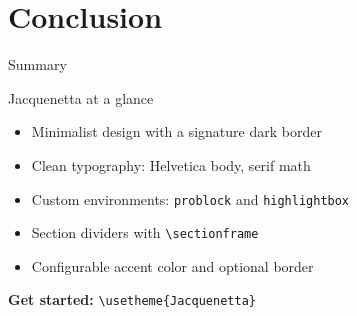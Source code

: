 \documentclass[aspectratio=169]{beamer}
\begin{document}
\section{Conclusion}


\begin{frame}{Summary}
    \begin{problock}{Jacquenetta at a glance}
        \begin{itemize}
            \item Minimalist design with a signature dark border
            \item Clean typography: Helvetica body, serif math
            \item Custom environments: \texttt{problock} and
                  \texttt{highlightbox}
            \item Section dividers with \texttt{\textbackslash sectionframe}
            \item Configurable accent color and optional border
        \end{itemize}
    \end{problock}

    \vspace{0.3cm}
    \begin{highlightbox}
        \centering
        \textbf{Get started:}\quad
        \texttt{\textbackslash usetheme\{Jacquenetta\}}
    \end{highlightbox}
\end{frame}

\thanksframe
\end{document}
